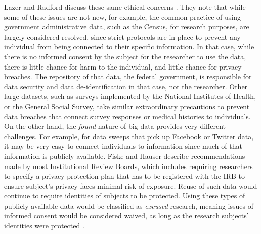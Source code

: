 \documentclass[sigconf]{acmart}
\begin{document}
Lazer and Radford discuss these same ethical concerns \cite {lazer17}.  They note that while some of these issues are not new, for example, the common practice of using government administrative data, such as the Census, for research purposes, are largely considered resolved, since strict protocols are in place to prevent any individual from being connected to their specific information.  In that case, while there is no informed consent by the subject for the researcher to use the data, there is little chance for harm to the individual, and little chance for privacy breaches.  The repository of that data, the federal government, is responsible for data security and data de-identification in that case, not the researcher.  Other large datasets, such as surveys implemented by the National Institutes of Health, or the General Social Survey, take similar extraordinary precautions to prevent data breaches that connect survey responses or medical histories to individuals.  On the other hand, the {\em found} nature of big data provides very different challenges.  For example, for data sweeps that pick up Facebook or Twitter data, it may be very easy to connect individuals to information since much of that information is publicly available.  Fiske and Hauser describe recommendations made by most Institutional Review Boards, which includes requiring researchers to specify a privacy-protection plan that has to be registered with the IRB to ensure subject's privacy faces minimal risk of exposure.  Reuse of such data would continue to require identities of subjects to be protected.  Using these types of publicly available data would be classified as {\em excused} research, meaning issues of informed consent would be considered waived, as long as the research subjects' identities were protected \cite{fiske14}.
\end{document}

